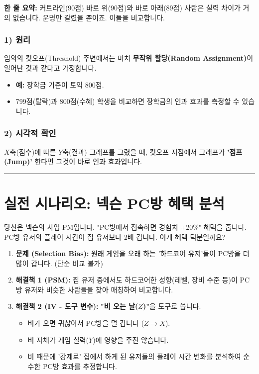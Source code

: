 \documentclass[11pt,a4paper]{book}
\theoremstyle{definition}
\begin{document}
\begin{conceptbox}[title={개념 4: 깻잎 한 장 차이}]
\textbf{한 줄 요약:} 커트라인(90점) 바로 위(90점)와 바로 아래(89점) 사람은 실력 차이가 거의 없습니다. 운명만 갈렸을 뿐이죠. 이들을 비교합니다.
\end{conceptbox}

\subsubsection*{1) 원리}
임의의 컷오프(Threshold) 주변에서는 마치 \textbf{무작위 할당(Random Assignment)}이 일어난 것과 같다고 가정합니다.
\begin{itemize}
    \item \textbf{예:} 장학금 기준이 토익 800점.
    \item 799점(탈락)과 800점(수혜) 학생을 비교하면 장학금의 인과 효과를 측정할 수 있습니다.
\end{itemize}

\subsubsection*{2) 시각적 확인}
$X$축(점수)에 따른 $Y$축(결과) 그래프를 그렸을 때, 컷오프 지점에서 그래프가 \textbf{'점프(Jump)'} 한다면 그것이 바로 인과 효과입니다.

\vspace{0.5cm}\hrule\vspace{0.5cm}

\section{실전 시나리오: 넥슨 PC방 혜택 분석}

\begin{storybox}[title={Scenario: PC방 혜택이 진짜 접속 시간을 늘릴까?}]
당신은 넥슨의 사업 PM입니다. "PC방에서 접속하면 경험치 +20\%" 혜택을 줍니다. PC방 유저의 플레이 시간이 집 유저보다 2배 깁니다. 이게 혜택 덕분일까요?
\end{storybox}

\begin{enumerate}
    \item \textbf{문제 (Selection Bias):} 원래 게임을 오래 하는 '하드코어 유저'들이 PC방을 더 많이 갑니다. (단순 비교 불가)
    
    \item \textbf{해결책 1 (PSM):} 집 유저 중에서도 하드코어한 성향(레벨, 장비 수준 등)이 PC방 유저와 비슷한 사람들을 찾아 매칭하여 비교합니다.
    
    \item \textbf{해결책 2 (IV - 도구 변수):} \textbf{"비 오는 날($Z$)"}을 도구로 씁니다.
    \begin{itemize}
        \item 비가 오면 귀찮아서 PC방을 덜 갑니다 ($Z \to X$).
        \item 비 자체가 게임 실력($Y$)에 영향을 주진 않습니다.
        \item 비 때문에 '강제로' 집에서 하게 된 유저들의 플레이 시간 변화를 분석하여 순수한 PC방 효과를 추정합니다.
    \end{itemize}
\end{enumerate}
\end{document}
